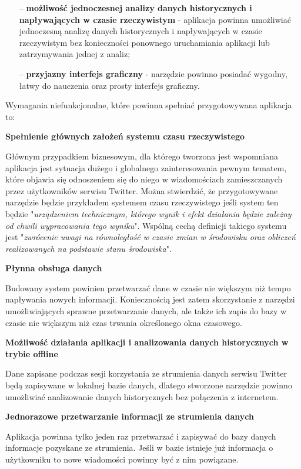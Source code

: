 \begin{itemize}
	\item[--] \textbf{możliwość jednoczesnej analizy danych historycznych i napływających w czasie rzeczywistym} - aplikacja powinna umożliwiać jednoczesną analizę danych historycznych i napływających w czasie rzeczywistym bez konieczności ponownego uruchamiania aplikacji lub zatrzymywania jednej z analiz;
	\item[--] \textbf{przyjazny interfejs graficzny} - narzędzie powinno posiadać wygodny, łatwy do nauczenia oraz prosty interfejs graficzny.
\end{itemize}

Wymagania niefunkcjonalne, które powinna spełniać przygotowywana aplikacja to: 

\textbf{Spełnienie głównych założeń systemu czasu rzeczywistego}

Głównym przypadkiem biznesowym, dla którego tworzona jest wspomniana aplikacja jest sytuacja dużego i globalnego zainteresowania pewnym tematem, które objawia się odnoszeniem się do niego w wiadomościach zamieszczanych przez użytkowników serwisu Twitter. Można stwierdzić, że przygotowywane narzędzie będzie przykładem systemem czasu rzeczywistego jeśli system ten będzie "\textit{urządzeniem technicznym, którego wynik i efekt działania będzie zależny od chwili wypracowania tego wyniku}". Wspólną cechą definicji takiego systemu jest "\textit{zwrócenie uwagi na równoległość w czasie zmian w środowisku oraz obliczeń realizowanych na podstawie stanu środowiska}".

\textbf{Płynna obsługa danych}

Budowany system powinien przetwarzać dane w czasie nie większym niż tempo napływania nowych informacji. Koniecznością jest zatem skorzystanie z narzędzi umożliwiających sprawne przetwarzanie danych, ale także ich zapis do bazy w czasie nie większym niż czas trwania określonego okna czasowego.

\textbf{Możliwość działania aplikacji i analizowania danych historycznych w trybie offline}

Dane zapisane podczas sesji korzystania ze strumienia danych serwisu Twitter będą zapisywane w lokalnej bazie danych, dlatego stworzone narzędzie powinno umożliwiać analizowanie danych historycznych bez połączenia z internetem.

\textbf{Jednorazowe przetwarzanie informacji ze strumienia danych} 

Aplikacja powinna tylko jeden raz przetwarzać i zapisywać do bazy danych informacje pozyskane ze strumienia. Jeśli w bazie istnieje już informacja o użytkowniku to nowe wiadomości powinny być z nim powiązane. 
 
